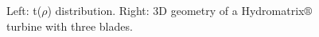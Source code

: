 \begin{figure}[h!]
\begin{minipage}[b]{0.5\linewidth}
 \centering
\end{minipage}
\begin{minipage}[b]{0.5\linewidth}
 \centering
\end{minipage}
\caption{Left: t($\rho$) distribution. Right: 3D geometry of a Hydromatrix$\circledR$ turbine with three blades.}
\label{param10}
\end{figure}

